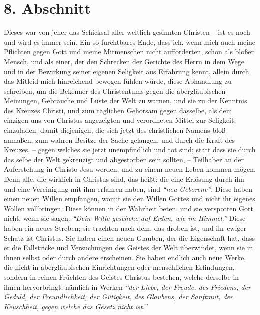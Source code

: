 \section{8. Abschnitt} \label{kap1_ab8}

Dieses war von jeher das Schicksal aller weltlich gesinnten Christen -- ist es
noch und wird es immer sein.
Ein so furchtbares Ende, dass ich, wenn mich auch meine Pflichten gegen Gott und
meine Mitmenschen nicht aufforderten, schon als bloßer Mensch, und als einer,
der den Schrecken der Gerichte des Herrn in dem Wege und in der Bewirkung seiner
eigenen Seligkeit aus Erfahrung kennt, allein durch das Mitleid mich hinreichend
bewogen fühlen würde, diese Abhandlung zu schreiben, um die Bekenner des
Christentums gegen die abergläubischen Meinungen, Gebräuche und Lüste der Welt
zu warnen, und sie zu der Kenntnis des Kreuzes Christi, und zum täglichen
Gehorsam gegen dasselbe, als dem einzigen uns von Christus angezeigten und
verordneten Mittel zur Seligkeit, einzuladen;
damit diejenigen, die sich jetzt des christlichen Namens bloß anmaßen, zum
wahren Besitze der Sache gelangen, und durch die Kraft des Kreuzes,
-- gegen welches sie jetzt unempfindlich und tot sind;
statt dass sie durch das selbe der Welt gekreuzigt und abgestorben sein sollten,
-- Teilhaber an der Auferstehung in Christo Jesu werden, und zu einem neuen
Leben kommen mögen.
Denn alle, die wirklich in Christus sind, das heißt:
die eine Erlösung durch ihn und eine Vereinigung mit ihm erfahren haben, sind
\textit{"`neu Geborene"'}.
Diese haben einen neuen Willen empfangen, womit sie den Willen Gottes und nicht
ihr eigenes Wollen vollbringen.
Diese können in der Wahrheit beten, und sie verspotten Gott nicht, wenn sie
sagen:
\textit{"`Dein Wille geschehe auf Erden, wie im Himmel."'}
Diese haben ein neues Streben;
sie trachten nach dem, das droben ist, und ihr ewiger Schatz ist
Christus.
Sie haben einen neuen Glauben, der die Eigenschaft hat, dass er die Fallstricke
und Versuchungen des Geistes der Welt überwindet, wenn sie in ihnen selbst oder
durch andere erscheinen.
Sie haben endlich auch neue Werke, die nicht in abergläubischen Einrichtungen
oder menschlichen Erfindungen, sondern in reinen Früchten des Geistes Christus
 bestehen, welche derselbe in ihnen hervorbringt;
nämlich in Werken
\textit{"`der Liebe, der Freude, des Friedens, der Geduld, der
Freundlichkeit, der Gütigkeit, des Glaubens, der Sanftmut, der Keuschheit,
gegen welche das Gesetz nicht ist."'}
